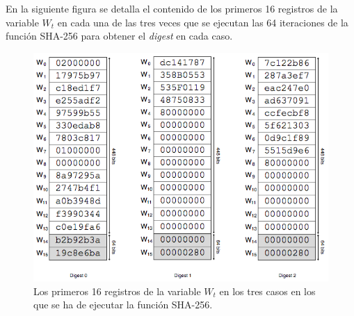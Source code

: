 \documentclass{article}
\begin{document}
    \vspace{3mm}
    En la siguiente figura se detalla el contenido de los primeros 16 registros de la variable $W_{t}$ en cada una de las tres veces que se ejecutan las 64 iteraciones de la función SHA-256 para obtener el \textit{digest} en cada caso.
    \begin{figure}[H]
    \centering
        \includegraphics[scale=0.59]{img/Bitcoin_block_SHA_256_W0_W15_x3}
        \caption{Los primeros 16 registros de la variable $W_{t}$ en los tres casos en los que se ha de ejecutar la función SHA-256.}
    \end{figure}
    
\end{document}
